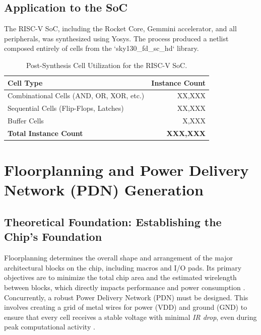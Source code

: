 \subsection{Application to the SoC}
The RISC-V SoC, including the Rocket Core, Gemmini accelerator, and all peripherals, was synthesized using Yosys. The process produced a netlist composed entirely of cells from the `sky130\_fd\_sc\_hd` library.

\begin{table}[h]
    \centering
    \caption{Post-Synthesis Cell Utilization for the RISC-V SoC.}
    \label{tab:synth_cells}
    \begin{tabular}{lr}
        \toprule
        \textbf{Cell Type} & \textbf{Instance Count} \\
        \midrule
        Combinational Cells (AND, OR, XOR, etc.) & XX,XXX \\
        Sequential Cells (Flip-Flops, Latches) & XX,XXX \\
        Buffer Cells & X,XXX \\
        \midrule
        \textbf{Total Instance Count} & \textbf{XXX,XXX} \\
        \bottomrule
    \end{tabular}
\end{table}

\section{Floorplanning and Power Delivery Network (PDN) Generation}

\subsection{Theoretical Foundation: Establishing the Chip's Foundation}

Floorplanning determines the overall shape and arrangement of the major architectural blocks on the chip, including macros and I/O pads. Its primary objectives are to minimize the total chip area and the estimated wirelength between blocks, which directly impacts performance and power consumption \cite{vlsi-springer}. Concurrently, a robust Power Delivery Network (PDN) must be designed. This involves creating a grid of metal wires for power (VDD) and ground (GND) to ensure that every cell receives a stable voltage with minimal \textit{IR drop}, even during peak computational activity \cite{vlsi-springer}.

